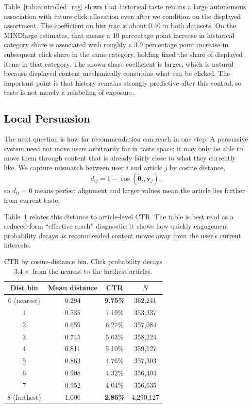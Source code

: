 \documentclass[11pt]{article}
\begin{document}
Table~\ref{tab:controlled_reg} shows that historical taste retains a large autonomous association with future click allocation even after we condition on the displayed assortment. The coefficient on $\text{hist\_frac}$ is about 0.40 in both datasets. On the MINDlarge estimates, that means a 10 percentage point increase in historical category share is associated with roughly a 3.9 percentage point increase in subsequent click share in the same category, holding fixed the share of displayed items in that category. The shown-share coefficient is larger, which is natural because displayed content mechanically constrains what can be clicked. The important point is that history remains strongly predictive after this control, so taste is not merely a relabeling of exposure.

\subsection{Local Persuasion}
\label{sec:persuasion}

The next question is how far recommendation can reach in one step. A persuasive system need not move users arbitrarily far in taste space; it may only be able to move them through content that is already fairly close to what they currently like. We capture mismatch between user $i$ and article $j$ by cosine distance,
\[
d_{ij} = 1 - \cos(\tilde{\boldsymbol{\theta}}_i,\mathbf{v}_j),
\]
so $d_{ij}=0$ means perfect alignment and larger values mean the article lies farther from current taste.

Table~\ref{tab:persuasion_radius} relates this distance to article-level CTR. The table is best read as a reduced-form ``effective reach'' diagnostic: it shows how quickly engagement probability decays as recommended content moves away from the user's current interests.

\begin{table}[ht]
\centering
\caption{CTR by cosine-distance bin. Click probability decays $3.4\times$ from the nearest to the farthest articles.}
\label{tab:persuasion_radius}
\begin{tabular}{cccc}
\toprule
Dist bin & Mean distance & CTR & $N$ \\
\midrule
0 (nearest) & 0.294 & \textbf{9.75\%} & 362,241 \\
1 & 0.535 & 7.19\% & 353,337 \\
2 & 0.659 & 6.27\% & 357,084 \\
3 & 0.745 & 5.63\% & 358,224 \\
4 & 0.811 & 5.10\% & 359,127 \\
5 & 0.863 & 4.76\% & 357,303 \\
6 & 0.908 & 4.32\% & 356,404 \\
7 & 0.952 & 4.04\% & 356,635 \\
8 (farthest) & 1.000 & \textbf{2.86\%} & 4,290,127 \\
\bottomrule
\end{tabular}
\end{table}
\FloatBarrier
\end{document}
